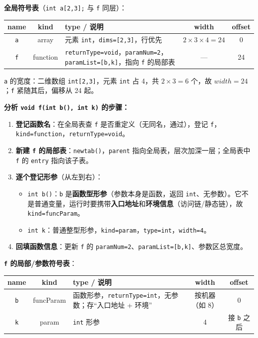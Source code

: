 \documentclass[UTF8,zihao=-4]{ctexart}
\newcommand{\kw}[1]{\texttt{#1}}
\begin{document}
\textbf{全局符号表}（\kw{int a[2,3];} 与 \kw{f} 同层）：

\begin{center}
\begin{tabular}{c|c|L{0.42\textwidth}|c|c}
name & kind & type / 说明 & width & offset\\
\hline
\kw{a} & array & 元素 \kw{int}，\kw{dims=[2,3]}，行优先 & $2{\times}3{\times}4=24$ & 0\\
\kw{f} & function & \kw{returnType=void}，\kw{paramNum=2}，\kw{paramList=[b,k]}，指向 \kw{f} 的局部表 & --- & 24\\
\end{tabular}
\end{center}

\kw{a} 的宽度：二维数组 \kw{int[2,3]}，元素 \kw{int} 占 4，共 $2{\times}3=6$ 个，故 $width=24$；\kw{f} 紧随其后，偏移从 24 起。

\textbf{分析 \kw{void f(int b(), int k)} 的步骤：}
\begin{enumerate}[label=(\arabic*)]
  \item \textbf{登记函数名}：在全局表查 \kw{f} 是否重定义（无同名，通过），登记 \kw{f}，\kw{kind=function}，\kw{returnType=void}。
  \item \textbf{新建 \kw{f} 的局部表}：\kw{newtab()}，\kw{parent} 指向全局表，层次加深一层；全局表中 \kw{f} 的 \kw{entry} 指向该子表。
  \item \textbf{逐个登记形参}（从左到右）：
    \begin{itemize}[leftmargin=1.6em]
      \item \kw{int b()}：\kw{b} 是\textbf{函数型形参}（参数本身是函数，返回 \kw{int}、无参数）。它不是普通变量，运行时要携带\textbf{入口地址}和\textbf{环境信息}（访问链/静态链），故 \kw{kind=funcParam}。
      \item \kw{int k}：普通整型形参，\kw{kind=param}，\kw{type=int}，\kw{width=4}。
    \end{itemize}
  \item \textbf{回填函数信息}：更新 \kw{f} 的 \kw{paramNum=2}、\kw{paramList=[b,k]}、参数区总宽度。
\end{enumerate}

\textbf{\kw{f} 的局部/参数符号表}：

\begin{center}
\begin{tabular}{c|c|L{0.40\textwidth}|c|c}
name & kind & type / 说明 & width & offset\\
\hline
\kw{b} & funcParam & 函数形参，\kw{returnType=int}，无参数；存“入口地址 + 环境” & 按机器（如 8） & 0\\
\kw{k} & param & \kw{int} 形参 & 4 & 接 \kw{b} 之后\\
\end{tabular}
\end{center}
\end{document}
